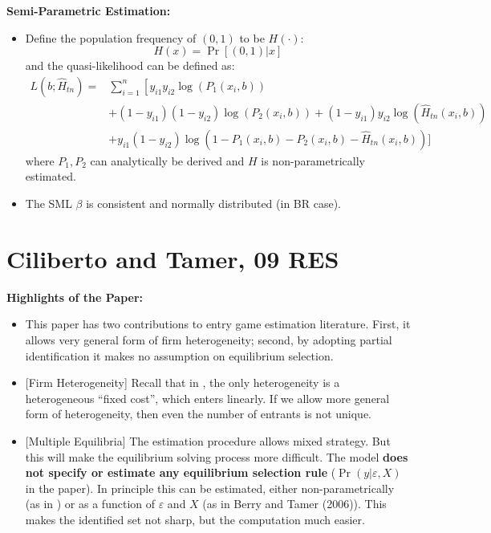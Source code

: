\documentclass{book}
\theoremstyle{plain}
\theoremstyle{definition}
\newcommand{\mytitle}[1]{{\large{\textbf{#1}}}}
\begin{document}
\mytitle{Semi-Parametric Estimation:}
\begin{itemize}
	\item Define the population frequency of $(0,1)$ to be $H(\cdot)$:
	\[H ( x ) = \operatorname { Pr } [ ( 0,1 ) | x ]\]
	and the quasi-likelihood can be defined as:
	\[\begin{aligned} L \left( b ; \hat { H } _ { t n } \right) = & \sum _ { i = 1 } ^ { n } \left[ y _ { i 1 } y _ { i 2 } \log \left( P _ { 1 } \left( x _ { i } , b \right) \right) \right. \\ & + \left( 1 - y _ { i 1 } \right) \left( 1 - y _ { i 2 } \right) \log \left( P _ { 2 } \left( x _ { i } , b \right) \right) + \left( 1 - y _ { i 1 } \right) y _ { i 2 } \log \left( \hat { H } _ { t n } \left( x _ { i } , b \right) \right) \\ & + y _ { i 1 } \left( 1 - y _ { i 2 } \right) \log \left( 1 - P _ { 1 } \left( x _ { i } , b \right) - P _ { 2 } \left( x _ { i } , b \right) - \hat { H } _ { t n } \left( x _ { i } , b \right) \right) ] \end{aligned}\]
	where $P_1, P_2$ can analytically be derived and $H$ is non-parametrically estimated.
	\item The SML $\beta$ is consistent and normally distributed (in BR case).
\end{itemize}


\section{Ciliberto and Tamer, 09 RES} %
\label{sec:ciliberto_and_tamer_09_res}

\textbf{}

\vspace{1em}
\noindent
\textbf{Highlights of the Paper:}
\begin{itemize}
	\item This paper has two contributions to entry game estimation literature. First, it allows very general form of firm heterogeneity; second, by adopting partial identification it makes no assumption on equilibrium selection.

	\item {[Firm Heterogeneity]} Recall that in \cite{Berry:1992gl}, the only heterogeneity is a heterogeneous ``fixed cost'', which enters linearly. If we allow more general form of heterogeneity, then even the number of entrants is not unique.

	\item {[Multiple Equilibria]} The estimation procedure allows mixed strategy. But this will make the equilibrium solving process more difficult. The model \textbf{does not specify or estimate any equilibrium selection rule} ($\Pr(y|\varepsilon,X)$ in the paper). In principle this can be estimated, either non-parametrically (as in \cite{Tamer:2003hi}) or as a function of $\varepsilon$ and $X$ (as in Berry and Tamer (2006)). This makes the identified set not sharp, but the computation much easier.
\end{itemize}
\end{document}
